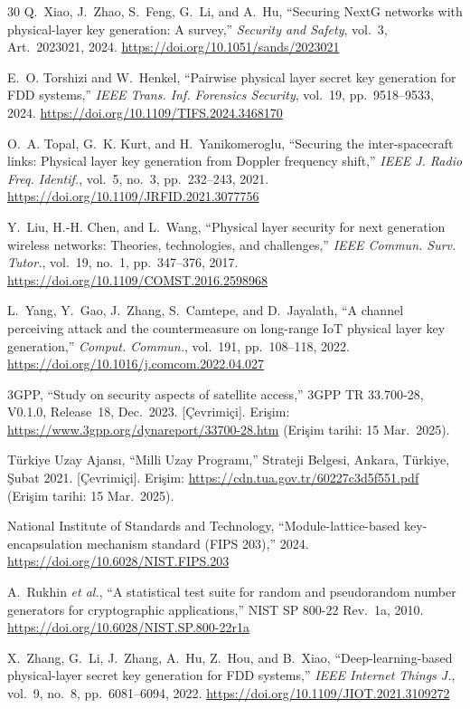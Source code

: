 \documentclass[conference,a4paper]{IEEEtran}
\begin{document}
\begin{thebibliography}{30}
Q.~Xiao, J.~Zhao, S.~Feng, G.~Li, and A.~Hu, ``Securing NextG networks with physical-layer key generation: A survey,'' \emph{Security and Safety}, vol.~3, Art.~2023021, 2024.
\url{https://doi.org/10.1051/sands/2023021}

E.~O. Torshizi and W.~Henkel, ``Pairwise physical layer secret key generation for FDD systems,'' \emph{IEEE Trans. Inf. Forensics Security}, vol.~19, pp.~9518--9533, 2024.
\url{https://doi.org/10.1109/TIFS.2024.3468170}

O.~A. Topal, G.~K. Kurt, and H.~Yanikomeroglu, ``Securing the inter-spacecraft links: Physical layer key generation from Doppler frequency shift,'' \emph{IEEE J. Radio Freq. Identif.}, vol.~5, no.~3, pp.~232--243, 2021.
\url{https://doi.org/10.1109/JRFID.2021.3077756}

Y.~Liu, H.-H. Chen, and L.~Wang, ``Physical layer security for next generation wireless networks: Theories, technologies, and challenges,'' \emph{IEEE Commun. Surv. Tutor.}, vol.~19, no.~1, pp.~347--376, 2017.
\url{https://doi.org/10.1109/COMST.2016.2598968}

L.~Yang, Y.~Gao, J.~Zhang, S.~Camtepe, and D.~Jayalath, ``A channel perceiving attack and the countermeasure on long-range IoT physical layer key generation,'' \emph{Comput. Commun.}, vol.~191, pp.~108--118, 2022.
\url{https://doi.org/10.1016/j.comcom.2022.04.027}

3GPP, ``Study on security aspects of satellite access,'' 3GPP TR 33.700-28, V0.1.0, Release~18, Dec.\ 2023. [Çevrimiçi]. Erişim: \url{https://www.3gpp.org/dynareport/33700-28.htm} (Erişim tarihi: 15 Mar.\ 2025).

Türkiye Uzay Ajansı, ``Milli Uzay Programı,'' Strateji Belgesi, Ankara, Türkiye, Şubat 2021. [Çevrimiçi]. Erişim: \url{https://cdn.tua.gov.tr/60227c3d5f551.pdf} (Erişim tarihi: 15 Mar.\ 2025).

National Institute of Standards and Technology, ``Module-lattice-based key-encapsulation mechanism standard (FIPS 203),'' 2024.
\url{https://doi.org/10.6028/NIST.FIPS.203}

A.~Rukhin \emph{et al.}, ``A statistical test suite for random and pseudorandom number generators for cryptographic applications,'' NIST SP 800-22 Rev.~1a, 2010.
\url{https://doi.org/10.6028/NIST.SP.800-22r1a}

X.~Zhang, G.~Li, J.~Zhang, A.~Hu, Z.~Hou, and B.~Xiao, ``Deep-learning-based physical-layer secret key generation for FDD systems,'' \emph{IEEE Internet Things J.}, vol.~9, no.~8, pp.~6081--6094, 2022.
\url{https://doi.org/10.1109/JIOT.2021.3109272}


\end{thebibliography}
\end{document}
